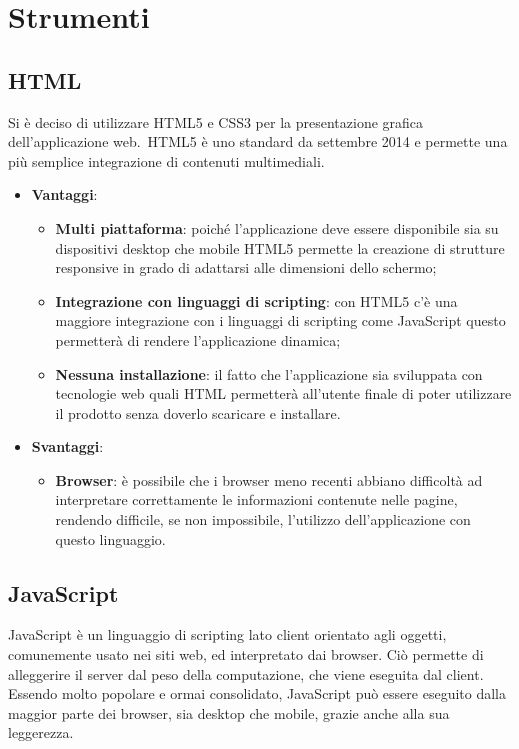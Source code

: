 \section{Strumenti}
	\subsection{HTML}{
		Si è deciso di utilizzare HTML5 e CSS3 per la presentazione grafica dell'applicazione web.\
		HTML5 è uno standard da settembre 2014 e permette una più semplice integrazione di contenuti multimediali.
	
		\begin{itemize}
			\item \textbf{Vantaggi}: 
			\begin{itemize}
				\item \textbf{Multi piattaforma}: poiché l'applicazione deve essere disponibile sia su dispositivi desktop che mobile HTML5 permette la creazione di strutture responsive in grado di adattarsi alle dimensioni dello schermo;
				\item \textbf{Integrazione con linguaggi di scripting}: con HTML5 c'è una maggiore integrazione con i linguaggi di scripting come JavaScript questo permetterà di rendere l'applicazione dinamica;
				\item \textbf{Nessuna installazione}: il fatto che l'applicazione sia sviluppata con tecnologie web quali HTML permetterà all'utente finale di poter utilizzare il prodotto senza doverlo scaricare e installare.
			\end{itemize}
			\item \textbf{Svantaggi}:
			\begin{itemize}
				\item \textbf{Browser}: è possibile che i browser meno recenti abbiano difficoltà ad interpretare correttamente le informazioni contenute nelle pagine, rendendo difficile, se non impossibile, l'utilizzo dell'applicazione con questo linguaggio.
			\end{itemize}
		\end{itemize}
		}
	\subsection{JavaScript}{
		JavaScript è un linguaggio di scripting lato client orientato agli oggetti, comunemente usato nei siti web, ed interpretato dai browser. Ciò permette di alleggerire il server dal peso della computazione, che viene eseguita dal client. Essendo molto popolare e ormai consolidato, JavaScript può essere eseguito dalla maggior parte dei browser, sia desktop che mobile, grazie anche alla sua leggerezza. 		}
